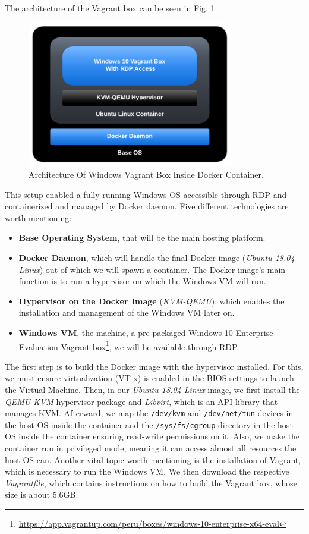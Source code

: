 The architecture of the Vagrant box can be seen in Fig. \ref{fig:windows_vagrant_box_architecture}. 

\begin{figure}[H]
    \includegraphics[width=9cm]{figures/vagrant_box_container_diagram.pdf}
    \caption{Architecture Of Windows Vagrant Box Inside Docker Container.}
    \label{fig:windows_vagrant_box_architecture}
\end{figure}

This setup enabled a fully running Windows OS accessible through RDP and containerized and managed by Docker daemon. Five different technologies are worth mentioning:

\begin{itemize}
    \item \textbf{Base Operating System}, that will be the main hosting platform.
    \item \textbf{Docker Daemon}, which will handle the final Docker image (\textit{Ubuntu 18.04 Linux}) out of which we will spawn a container. The Docker image's main function is to run a hypervisor on which the Windows VM will run.
    \item \textbf{Hypervisor on the Docker Image} (\textit{KVM-QEMU}), which enables the installation and management of the Windows VM later on.
    \item \textbf{Windows VM}, the machine, a pre-packaged Windows 10 Enterprise Evaluation Vagrant box\footnote{\url{https://app.vagrantup.com/peru/boxes/windows-10-enterprise-x64-eval}}, we will be available through RDP.
\end{itemize}

The first step is to build the Docker image with the hypervisor installed. For this, we must ensure virtualization (VT-x) is enabled in the BIOS settings to launch the Virtual Machine. Then, in our \textit{Ubuntu 18.04 Linux} image, we first install the \textit{QEMU-KVM} hypervisor package and \textit{Libvirt}, which is an API library that manages KVM. Afterward, we map the \texttt{/dev/kvm} and \texttt{/dev/net/tun} devices in the host OS inside the container and the \texttt{/sys/fs/cgroup} directory in the host OS inside the container ensuring read-write permissions on it. Also, we make the container run in privileged mode, meaning it can access almost all resources the host OS can. Another vital topic worth mentioning is the installation of Vagrant, which is necessary to run the Windows VM. We then download the respective \textit{Vagrantfile}, which contains instructions on how to build the Vagrant box, whose size is about 5.6GB.

